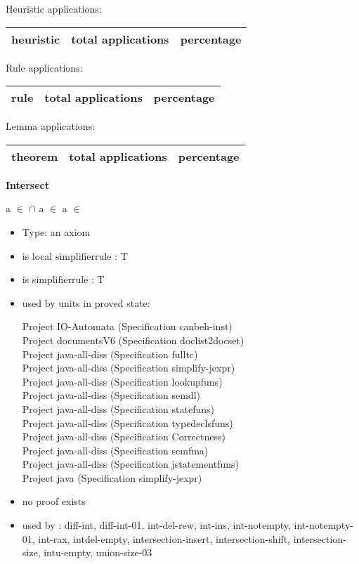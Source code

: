 \documentclass[a4paper]{article}
\begin{document}
\medskip


Heuristic applications:

\begin{supertabular}{l|r|r}
heuristic	& total applications & percentage \\ \hline

\end{supertabular}

Rule applications:

\begin{supertabular}{l|r|r}
rule	        & total applications & percentage \\ \hline

\end{supertabular}

Lemma applications:

\begin{supertabular}{l|r|r}
theorem	        & total applications & percentage \\ \hline

\end{supertabular}
\pagebreak

{\LARGE\bf Intersect}\label{lemma-Intersect}

\medskip

 \Fol a $\in$  $\cap$  \Equiv a $\in$  \And a $\in$ 

\begin{itemize}

\item Type: an axiom

\item is local simplifierrule : T
\item is simplifierrule : T
\item used by units in proved state:

Project IO-Automata (Specification canbeh-inst) \\
Project documentsV6 (Specification doclist2docset) \\
Project java-all-diss (Specification fulltc) \\
Project java-all-diss (Specification simplify-jexpr) \\
Project java-all-diss (Specification lookupfuns) \\
Project java-all-diss (Specification semdl) \\
Project java-all-diss (Specification statefuns) \\
Project java-all-diss (Specification typedeclsfuns) \\
Project java-all-diss (Specification Correctness) \\
Project java-all-diss (Specification semfma) \\
Project java-all-diss (Specification jstatementfuns) \\
Project java (Specification simplify-jexpr)
\item       no proof exists
\item       used by      : diff-int, diff-int-01, int-del-rew, int-ins, int-notempty, int-notempty-01, int-rax, intdel-empty, intersection-insert, intersection-shift, intersection-size, intu-empty, union-size-03
\end{itemize}
\end{document}
